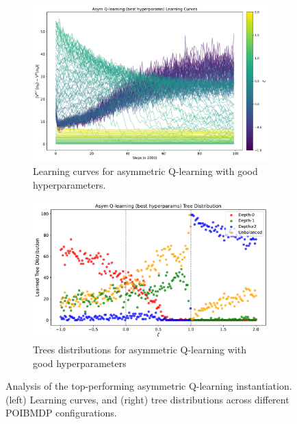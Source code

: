 \begin{figure}
    \begin{subfigure}[b]{0.49\textwidth}
        \includegraphics[width=\textwidth]{images/images_part1/ql_asym_best_learning_curves.pdf}
        \caption{Learning curves for asymmetric Q-learning with good hyperparameters.}
        \label{fig:best-learning-curves}
    \end{subfigure}
    \hfill
    \begin{subfigure}[b]{0.49\textwidth}
        \includegraphics[width=\textwidth]{images/images_part1/ql_asym_best_tree_distributions.pdf}
        \caption{Trees distributions for asymmetric Q-learning with good hyperparameters}
        \label{fig:best-tree-distributions}
    \end{subfigure}
    \caption{Analysis of the top-performing asymmetric Q-learning instantiation. (left) Learning curves, and (right) tree distributions across different POIBMDP configurations.}
    \label{fig:asym-ql-analysis}
\end{figure}



